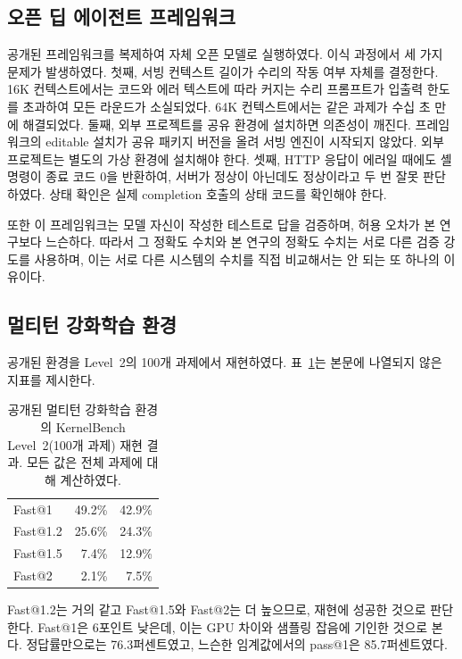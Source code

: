 \subsection{오픈 딥 에이전트 프레임워크}
공개된 프레임워크를 복제하여 자체 오픈 모델로 실행하였다. 이식 과정에서 세 가지 문제가 발생하였다.
첫째, 서빙 컨텍스트 길이가 수리의 작동 여부 자체를 결정한다. 16K 컨텍스트에서는 코드와 에러 텍스트에
따라 커지는 수리 프롬프트가 입출력 한도를 초과하여 모든 라운드가 소실되었다. 64K 컨텍스트에서는 같은
과제가 수십 초 만에 해결되었다. 둘째, 외부 프로젝트를 공유 환경에 설치하면 의존성이 깨진다.
프레임워크의 editable 설치가 공유 패키지 버전을 올려 서빙 엔진이 시작되지 않았다. 외부 프로젝트는
별도의 가상 환경에 설치해야 한다. 셋째, HTTP 응답이 에러일 때에도 셸 명령이 종료 코드 0을 반환하여,
서버가 정상이 아닌데도 정상이라고 두 번 잘못 판단하였다. 상태 확인은 실제 completion 호출의 상태
코드를 확인해야 한다.

또한 이 프레임워크는 모델 자신이 작성한 테스트로 답을 검증하며, 허용 오차가 본 연구보다 느슨하다.
따라서 그 정확도 수치와 본 연구의 정확도 수치는 서로 다른 검증 강도를 사용하며, 이는 서로 다른
시스템의 수치를 직접 비교해서는 안 되는 또 하나의 이유이다.

\subsection{멀티턴 강화학습 환경}
공개된 환경을 Level~2의 100개 과제에서 재현하였다. 표~\ref{tab:repro}는 본문에 나열되지 않은
지표를 제시한다.

\begin{table}[h]
\centering
\small
\setlength{\tabcolsep}{7pt}
\caption{공개된 멀티턴 강화학습 환경의 KernelBench Level~2(100개 과제) 재현 결과.
모든 값은 전체 과제에 대해 계산하였다.}
\label{tab:repro}
\begin{tabular}{@{}lrr@{}}
\toprule
\headrow{지표} & \headrow{원 논문} & \headrow{본 재현} \\
\midrule
Fast@1   & 49.2\% & 42.9\% \\
Fast@1.2 & 25.6\% & 24.3\% \\
Fast@1.5 & 7.4\%  & 12.9\% \\
Fast@2   & 2.1\%  & 7.5\%  \\
\bottomrule
\end{tabular}
\end{table}

Fast@1.2는 거의 같고 Fast@1.5와 Fast@2는 더 높으므로, 재현에 성공한 것으로 판단한다. Fast@1은
6포인트 낮은데, 이는 GPU 차이와 샘플링 잡음에 기인한 것으로 본다. 정답률만으로는 76.3퍼센트였고,
느슨한 임계값에서의 pass@1은 85.7퍼센트였다.

